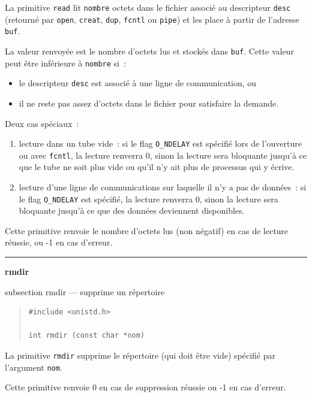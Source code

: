 \documentclass [twoside] {report}
\newcommand {\primitive} [1]
    {
	\phantomsection
	{\large \textbf {#1}}
	\addcontentsline {toc} {subsection} {#1}
    }
\newcommand {\separation}
    {
	\vspace {5mm}
	\nopagebreak
	\hrule
    }
\begin{document}
La primitive \texttt {read} lit \texttt {nombre} octets dans
le fichier associé au descripteur \texttt {desc}
(retourné par \texttt {open}, \texttt {creat}, \texttt {dup}, \texttt {fcntl}
ou \texttt {pipe}) et les place à partir de l'adresse
\texttt {buf}.

La valeur renvoyée est le nombre d'octets lus et
stockés dans \texttt {buf}. Cette valeur peut être
inférieure à \texttt {nombre} si~:
\begin {itemize}
    \item le descripteur \texttt {desc} est associé à une ligne
	de communication, ou
    \item il ne reste pas assez d'octets dans le fichier
	pour satisfaire la demande.
\end {itemize}

Deux cas spéciaux~:

\begin {enumerate}
    \item lecture dans un tube vide~: si le flag \texttt {O\_NDELAY}
	est spécifié lors de l'ouverture ou avec \texttt {fcntl},
	la lecture renverra 0, sinon la lecture
	sera bloquante jusqu'à ce que le tube ne soit plus
	vide ou qu'il n'y ait plus de processus qui y écrive.
    \item lecture d'une ligne de communications sur
	laquelle il n'y a pas de données~: si le flag \texttt {O\_NDELAY}
	est spécifié, la lecture renverra 0, sinon la lecture
	sera bloquante jusqu'à ce que des données
	deviennent disponibles.
\end {enumerate}

Cette primitive renvoie le nombre d'octets lus
(non négatif) en cas de lecture
réussie, ou -1 en cas d'erreur.




\separation
\primitive {rmdir} --- supprime un répertoire

\begin {quote}
\begin {verbatim}
#include <unistd.h>

int rmdir (const char *nom)
\end{verbatim}
\end {quote}

La primitive \texttt {rmdir} supprime le répertoire (qui doit être vide)
spécifié par l'argument \texttt {nom}.

Cette primitive renvoie 0 en cas de suppression réussie
ou -1 en cas d'erreur.
\end{document}
